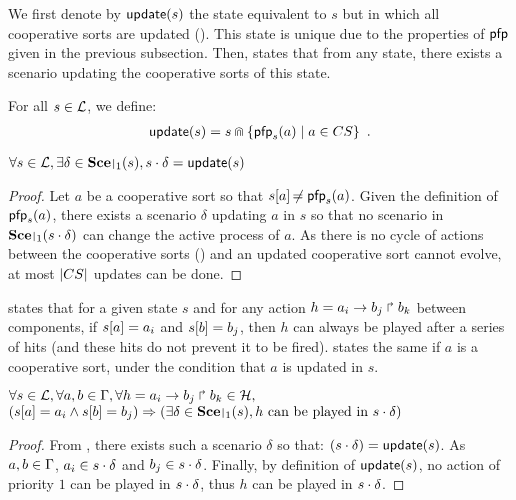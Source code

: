 We first denote by $\mathsf{update}(s)$ the state equivalent to $s$ but in which all cooperative sorts are updated ().
This state is unique due to the properties of $\mathsf{pfp}$ given in the previous subsection.
Then,  states that from any state, there exists a scenario updating the cooperative sorts of this state.
%
\begin{definition}[$\update : \PHl \rightarrow \PHl$]
\label{def:update}
  For all $s \in \mathcal{L}$, we define:
  \begin{align*}
    \mathsf{update}(s) = s \Cap \{ \mathsf{pfp}_{s}(a) \mid a \in CS \} \enspace.
  \end{align*}
\end{definition}
%
\begin{theorem}
\label{th:update}
  $\forall s \in \PHl, \exists \delta \in \restriction{\Sce}{1}(s), s \PHplay \delta = \update(s)$
\end{theorem}
\begin{proof}
  Let $a$ be a cooperative sort so that ${s[a]} \not\nobreak\mkern -2mu = \mathsf{pfp}_s(a)$.
  Given the definition of $\mathsf{pfp}_s(a)$, there exists a scenario $\delta$ updating $a$ in $s$ so that
  no scenario in $\restriction{\Sce}{1}(s \PHplay \delta)$ can change the active process of $a$.
  As there is no cycle of actions between the cooperative sorts () and an updated cooperative sort cannot evolve, at most $|CS|$ updates can be done.
\end{proof}
 states that for a given state $s$ and for any action $h = a_i\rightarrow b_j\Rsh b_k$ between components,
if ${s[a]} = a_i$ and ${s[b]} = b_j$, then
$h$ can always be played after a series of hits (and these hits do not prevent it to be fired).
 states the same if $a$ is a cooperative sort, under the condition that $a$ is updated in $s$.
\begin{theorem}
\label{th:hcompcomp}
  $\forall s \in \mathcal{L}, \forall a,b \in \Gamma, \forall h = a_i\rightarrow b_j\Rsh b_k \in \mathcal{H},$\\
  $(\PHget{s}{a} = a_i \wedge \PHget{s}{b} = b_j) \Rightarrow (\exists \delta \in \restriction{\Sce}{1}(s), \text{$h$ can be played in $s \PHplay \delta$})$
\end{theorem}
\begin{proof}
  From , there exists such a scenario $\delta$ so that: $(s \cdot \delta) = \mathsf{update}(s)$.
  As $a,b \in \Gamma$, $a_i \in s \cdot \delta$ and $b_j \in s \cdot \delta$.
  Finally, by definition of $\mathsf{update}(s)$, no action of priority $1$ can be played in $s \cdot \delta$, thus $h$ can be played in $s \cdot \delta$.
\end{proof}
